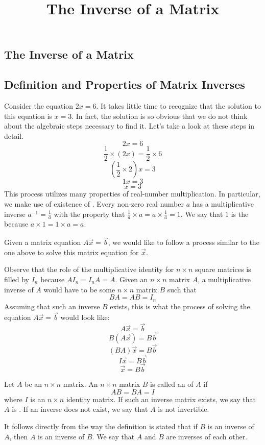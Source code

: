\documentclass{ximera}
\title{The Inverse of a Matrix} \license{CC BY-NC-SA 4.0}
\begin{document}
\begin{abstract}
 
\end{abstract}
\maketitle

\begin{onlineOnly}
\section*{The Inverse of a Matrix}
\end{onlineOnly}

\subsection*{Definition and Properties of Matrix Inverses}
Consider the equation $2x=6$.  It takes little time to recognize that the solution to this equation is $x=3$.  In fact, the solution is so obvious that we do not think about the algebraic steps necessary to find it.  Let's take a look at these steps in detail.
$$2x=6$$
$$\frac{1}{2}\times (2x)=\frac{1}{2}\times 6$$
$$(\frac{1}{2}\times 2)x=3$$
$$1x=3$$
$$x=3$$
This process utilizes many properties of real-number multiplication.  In particular, we make use of existence of .  Every non-zero real number $a$  has a multiplicative inverse $a^{-1}=\frac{1}{a}$ with the property that $\frac{1}{a}\times a=a\times \frac{1}{a}=1$.  We say that $1$ is the  because $a\times 1=1\times a=a$.

Given a matrix equation $A\vec{x}=\vec{b}$, we would like to follow a process similar to the one above to solve this matrix equation for $\vec{x}$.  

Observe that the role of the multiplicative identity for $n\times n$ square matrices is filled by $I_n$ because $AI_n=I_nA=A$. Given an $n\times n$ matrix $A$, a multiplicative inverse of $A$ would have to be some $n\times n$ matrix $B$ such that
$$BA=AB=I_n$$
Assuming that such an inverse $B$ exists, this is what the process of solving the equation $A\vec{x}=\vec{b}$ would look like:
$$A\vec{x}=\vec{b}$$
$$B(A\vec{x})=B\vec{b}$$
$$(BA)\vec{x}=B\vec{b}$$
$$I\vec{x}=B\vec{b}$$
$$\vec{x}=B\vec{b}$$

\begin{definition}\label{def:matinverse}
Let $A$ be an $n\times n$ matrix.  An $n\times n$ matrix $B$ is called an  of $A$ if 
$$AB=BA=I$$
where $I$ is an $n\times n$ identity matrix.  If such an inverse matrix exists, we say that $A$ is .  If an inverse does not exist, we say that $A$ is not invertible.
\end{definition}
It follows directly from the way the definition is stated that if $B$ is an inverse of $A$, then $A$ is an inverse of $B$. We say that $A$ and $B$ are inverses of each other.
\end{document}
